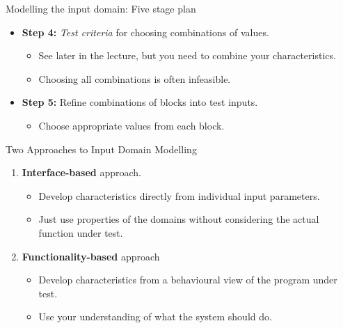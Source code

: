 \documentclass{beamer}
\newcommand{\pauseslide}{}
\begin{document}
\begin{frame}{Modelling the input domain: Five stage plan}
  \begin{itemize}
  \item {\bf Step 4:} {\it Test criteria} for choosing combinations of values.
    \begin{itemize}
    \item See later in the lecture, but you need to combine your
      characteristics.
    \item Choosing all combinations is often infeasible.
    \end{itemize}
  \item {\bf Step 5:} Refine combinations of blocks into test inputs.
    \begin{itemize}
    \item Choose appropriate values from each block.
    \end{itemize}
  \end{itemize}
\end{frame}
\pauseslide
\begin{frame}{Two Approaches to Input Domain Modelling}
  \begin{enumerate}
  \item {\bf Interface-based} approach.
    \begin{itemize}
    \item Develop characteristics directly from individual input
      parameters.
    \item Just use properties of the domains without considering the
      actual function under test.
    \end{itemize}
  \item {\bf Functionality-based} approach
    \begin{itemize}
    \item Develop characteristics from a behavioural view of the
      program under test.
    \item Use your understanding of what the system should do. 
    \end{itemize}
  \end{enumerate}
  
\end{frame}
\end{document}
